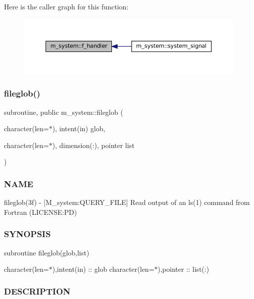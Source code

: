Here is the caller graph for this function\+:\nopagebreak
\begin{figure}[H]
\begin{center}
\leavevmode
\includegraphics[width=350pt]{namespacem__system_a078c9adfb12b36e88534248e99ed9fcc_icgraph}
\end{center}
\end{figure}
\mbox{\label{namespacem__system_a79656f76ad75168302e0d770052e901e}} 
\subsubsection{\texorpdfstring{fileglob()}{fileglob()}}
{\footnotesize\ttfamily subroutine, public m\+\_\+system\+::fileglob (\begin{DoxyParamCaption}\item[{character(len=$\ast$), intent(in)}]{glob,  }\item[{character(len=$\ast$), dimension(\+:), pointer}]{list }\end{DoxyParamCaption})}



\subsubsection*{N\+A\+ME}

fileglob(3f) -\/ \mbox{[}M\+\_\+system\+:Q\+U\+E\+R\+Y\+\_\+\+F\+I\+LE\mbox{]} Read output of an ls(1) command from Fortran (L\+I\+C\+E\+N\+SE\+:PD) 

\subsubsection*{S\+Y\+N\+O\+P\+S\+IS}

subroutine fileglob(glob,list)

character(len=$\ast$),intent(in) \+:\+: glob character(len=$\ast$),pointer \+:\+: list(\+:)

\subsubsection*{D\+E\+S\+C\+R\+I\+P\+T\+I\+ON}

